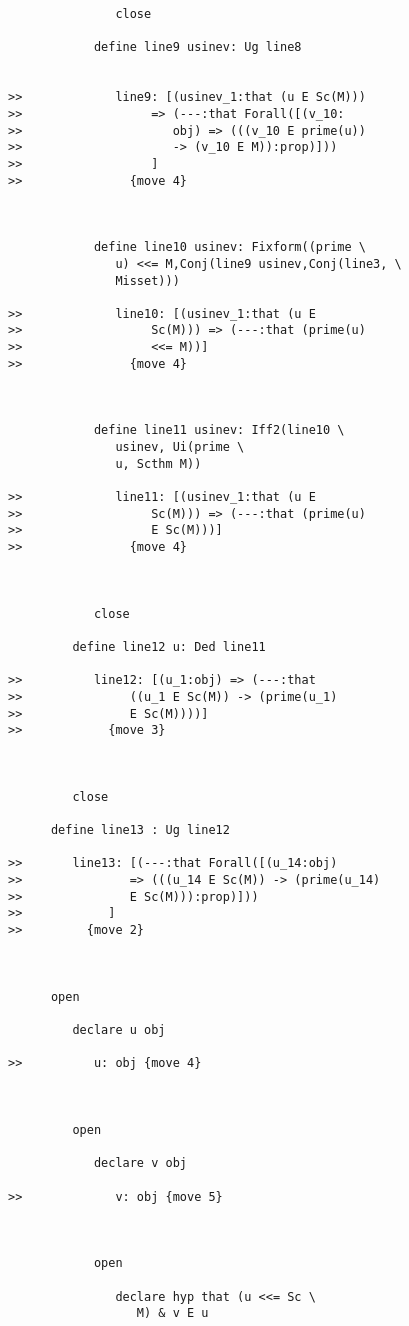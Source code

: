 \documentclass[12pt]{article}
\begin{document}
\begin{verbatim}
               close

            define line9 usinev: Ug line8


>>             line9: [(usinev_1:that (u E Sc(M)))
>>                  => (---:that Forall([(v_10:
>>                     obj) => (((v_10 E prime(u))
>>                     -> (v_10 E M)):prop)]))
>>                  ]
>>               {move 4}



            define line10 usinev: Fixform((prime \
               u) <<= M,Conj(line9 usinev,Conj(line3, \
               Misset)))

>>             line10: [(usinev_1:that (u E
>>                  Sc(M))) => (---:that (prime(u)
>>                  <<= M))]
>>               {move 4}



            define line11 usinev: Iff2(line10 \
               usinev, Ui(prime \
               u, Scthm M))

>>             line11: [(usinev_1:that (u E
>>                  Sc(M))) => (---:that (prime(u)
>>                  E Sc(M)))]
>>               {move 4}



            close

         define line12 u: Ded line11

>>          line12: [(u_1:obj) => (---:that
>>               ((u_1 E Sc(M)) -> (prime(u_1)
>>               E Sc(M))))]
>>            {move 3}



         close

      define line13 : Ug line12

>>       line13: [(---:that Forall([(u_14:obj)
>>               => (((u_14 E Sc(M)) -> (prime(u_14)
>>               E Sc(M))):prop)]))
>>            ]
>>         {move 2}



      open

         declare u obj

>>          u: obj {move 4}



         open

            declare v obj

>>             v: obj {move 5}



            open

               declare hyp that (u <<= Sc \
                  M) & v E u


\end{verbatim}
\end{document}
